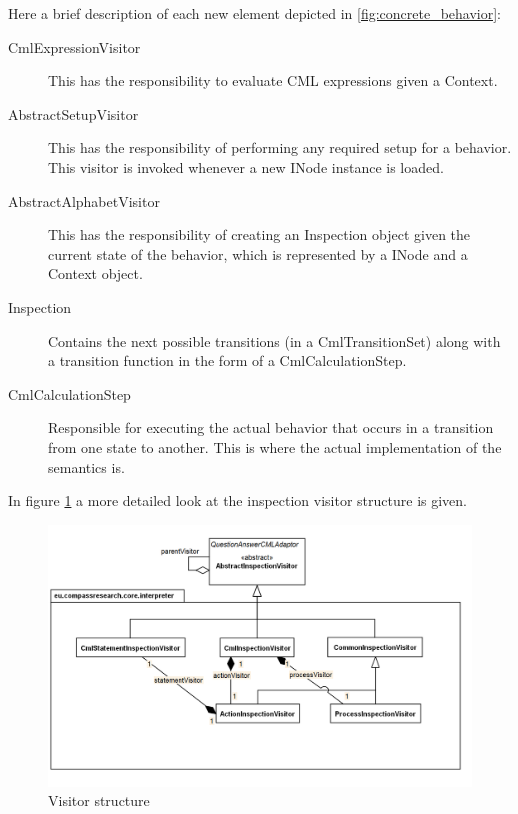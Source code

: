 \documentclass[a4paper, 10pt]{include/compassreport}   %
\begin{document}
Here a brief description of each new element depicted in \autoref{fig:concrete_behavior}:
\begin{description}
\item[CmlExpressionVisitor] This has the responsibility to evaluate
  CML expressions given a Context.

\item[AbstractSetupVisitor] This has the responsibility of performing
  any required setup for a behavior. This visitor is invoked
  whenever a new INode instance is loaded.

\item[AbstractAlphabetVisitor] This has the responsibility of creating
  an Inspection object given the current state of the behavior, which is
  represented by a INode and a Context object.

\item[Inspection] Contains the next possible transitions (in a
  CmlTransitionSet) along with a transition function in the form of a
  CmlCalculationStep.

\item[CmlCalculationStep] Responsible for executing the actual
  behavior that occurs in a transition from one state to another. This
  is where the actual implementation of the semantics is.
\end{description}


In figure \ref{fig:visitors} a more detailed look at the inspection visitor structure is given.

\begin{figure}[ht!]
  \begin{center}
    \includegraphics[width=1\textwidth]{figures/Visitors}
    \caption{Visitor structure}
    \label{fig:visitors}
  \end{center}
\end{figure}
\end{document}
